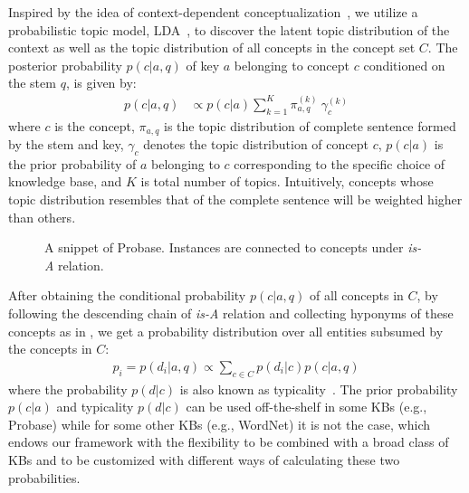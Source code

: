Inspired by the idea of context-dependent conceptualization~\cite{kim2013context}, we utilize a probabilistic topic model, LDA~\cite{Blei:2003:LDA:944919.944937}, to discover the latent topic distribution of the context as well as the topic distribution of all concepts in the concept set $C$. The posterior probability $p(c|a, q)$
of key $a$ belonging to concept $c$ conditioned on the stem $q$, is given by: 
\begin{align}
	p(c|a, q) &\propto p(c|a) \sum_{k=1}^K \pi_{a,q}^{(k)} ~ \gamma_{c}^{(k)}
	\label{eq:pc}
\end{align}
where $c$ is the concept, $\pi_{a,q}$ is the topic distribution of complete sentence formed by the stem and key, $\gamma_{c}$ denotes the topic distribution of concept $c$, $p(c|a)$ is the prior probability of $a$ belonging to $c$ corresponding to the specific choice of knowledge base, 
and $K$ is total number of topics. 
Intuitively, concepts whose topic distribution resembles that of the complete sentence will be weighted higher than others.
\begin{figure}[t]
\centering
{}
\caption{A snippet of Probase. Instances are connected to concepts under \textit{is-A} relation.} \label{fig:probase}
\end{figure}
After obtaining the conditional probability $p(c|a, q)$ of all concepts in 
$C$, by following the descending chain of \textit{is-A} relation and 
collecting hyponyms of these concepts as in , we get a probability distribution over 
all entities subsumed by the concepts in $C$:
\begin{align}	
	p_{i} = p(d_i|a,q) \propto \sum_{c\in C} p(d_i|c) p(c|a,q)
	\label{eq:pd}
\end{align}
where the probability $p(d|c)$ is also known as 
typicality~\cite{wu2012probase}. 
The prior probability $p(c|a)$ and typicality $p(d|c)$ can be used
off-the-shelf in some KBs (e.g., Probase) while for some other KBs
(e.g., WordNet) it is not the case, which endows our framework with 
the flexibility to be combined with a broad class of KBs and 
to be customized with different ways of calculating these two probabilities.

